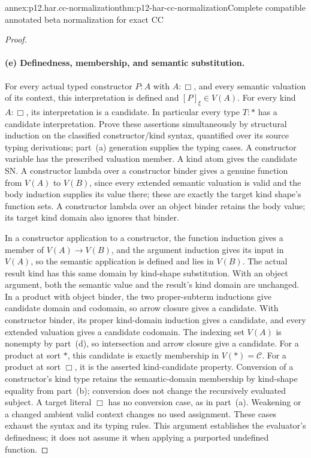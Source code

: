 \begin{annexitem}{annex:p12.har.cc-normalization}{thm:p12-har-cc-normalization}{Complete compatible annotated beta normalization for exact CC}
\begin{proof}
\paragraph{(e) Definedness, membership, and semantic substitution.}
For every actual typed constructor \(P:A\) with \(A:\Box\), and
every semantic valuation of its context, this interpretation is defined
and \([P]_\xi\in V(A)\). For every kind \(A:\Box\), its
interpretation is a candidate. In particular every type \(T:\ast\)
has a candidate interpretation. Prove these assertions simultaneously
by structural induction on the classified constructor/kind syntax,
quantified over its source typing derivations; part~(a) generation supplies
the typing cases. A constructor variable has the prescribed valuation
member. A kind atom gives the candidate SN. A constructor lambda over
a constructor binder gives a genuine function from \(V(A)\) to
\(V(B)\), since every extended semantic valuation is valid and the
body induction supplies its value there; these are exactly the target
kind shape's function sets. A constructor lambda over an object binder
retains the body value; its target kind domain also ignores that binder.

In a constructor application to a constructor, the function induction
gives a member of \(V(A)\to V(B)\), and the argument induction
gives its input in \(V(A)\), so the semantic application is defined
and lies in \(V(B)\). The actual result kind has this same domain by
kind-shape substitution. With an object argument, both the semantic
value and the result's kind domain are unchanged. In a product with
object binder, the two proper-subterm inductions give candidate domain
and codomain, so arrow closure gives a candidate. With constructor
binder, its proper kind-domain induction gives a candidate, and every
extended valuation gives a candidate codomain. The indexing set \(V(A)\)
is nonempty by part~(d), so intersection and arrow closure give a candidate.
For a product at sort \(\ast\), this candidate is exactly membership
in \(V(\ast)=\mathcal C\). For a product at sort \(\Box\), it
is the asserted kind-candidate property. Conversion of a constructor's
kind type retains the semantic-domain membership by kind-shape equality
from part~(b); conversion does not change the recursively evaluated subject.
A target literal \(\Box\) has no conversion case, as in part~(a).
Weakening or a changed ambient valid context changes no used assignment.
These cases exhaust the syntax and its typing rules. This argument
establishes the evaluator's definedness; it does not assume it when
applying a purported undefined function.


\end{proof}
\end{annexitem}
